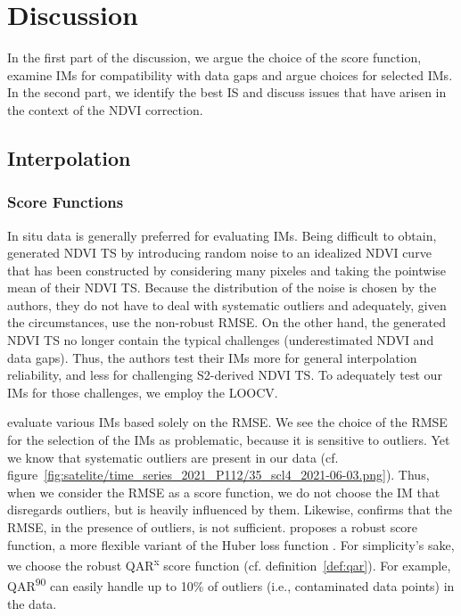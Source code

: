 \chapter{Discussion}\label{sec:discussion}
    In the first part of the discussion, we argue the choice of the score function, examine IMs for compatibility with data gaps and argue choices for selected IMs. In the second part, we identify the best IS and discuss issues that have arisen in the context of the NDVI correction.


\section{Interpolation}{ \label{sec:discussion_itpl}
    \subsection{Score Functions}{
        In situ data is generally preferred for evaluating IMs. Being difficult to obtain, \cite{liHighqualityVegetationIndex2021} generated NDVI TS by introducing random noise to an idealized NDVI curve that has been constructed by considering many pixeles and taking the pointwise mean of their NDVI TS. Because the distribution of the noise is chosen by the authors, they do not have to deal with systematic outliers and adequately, given the circumstances, use the non-robust RMSE. On the other hand, the generated NDVI TS no longer contain the typical challenges (underestimated NDVI and data gaps). Thus, the authors test their IMs more for general interpolation reliability, and less for challenging S2-derived NDVI TS. To adequately test our IMs for those challenges, we employ the LOOCV.

        \cite{caiPerformanceSmoothingMethods2017a} evaluate various IMs based solely on the RMSE. We see the choice of the RMSE for the selection of the IMs as problematic, because it is sensitive to outliers. Yet we know that systematic outliers are present in our data (cf. figure~\ref{fig:satelite/time_series_2021_P112/35_scl4_2021-06-03.png}). Thus, when we consider the RMSE as a score function, we do not choose the IM that disregards outliers, but is heavily influenced by them. Likewise, \cite{liemohnRMSENotEnough2021} confirms that the RMSE, in the presence of outliers, is not sufficient. \cite{barronGeneralAdaptiveRobust2019} proposes a robust score function, a more flexible variant of the Huber loss function \citep{huberRobustEstimationLocation1964}. For simplicity's sake, we choose the robust QAR\textsuperscript{x} score function (cf. definition~\ref{def:qar}). For example, QAR\textsuperscript{90} can easily handle up to 10\% of outliers (i.e., contaminated data points) in the data.                 
    }

}
